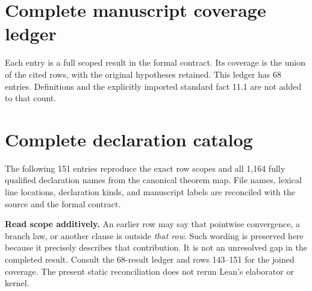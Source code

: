 \KomorebiCover
{}


\begingroup\small
\tableofcontents
\endgroup
\clearpage
{}

\clearpage
\clearpage
\clearpage
\clearpage
\clearpage
\clearpage
\clearpage
\clearpage
\clearpage
\section{Complete manuscript coverage ledger}
\label{sec:ledger}
Each entry is a full scoped result in the formal contract. Its coverage is the union of the cited rows, with the original hypotheses retained. This ledger has 68 entries. Definitions and the explicitly imported standard fact 11.1 are not added to that count.

\clearpage
\section{Complete declaration catalog}
\label{sec:catalog}
The following 151 entries reproduce the exact row scopes and all 1,164 fully qualified declaration names from the canonical theorem map. File names, lexical line locations, declaration kinds, and manuscript labels are reconciled with the source and the formal contract.

\textbf{Read scope additively.} An earlier row may say that pointwise convergence, a branch law, or another clause is outside \emph{that row}. Such wording is preserved here because it precisely describes that contribution. It is not an unresolved gap in the completed result. Consult the 68-result ledger and rows 143--151 for the joined coverage. The present static reconciliation does not rerun Lean's elaborator or kernel.

\clearpage
